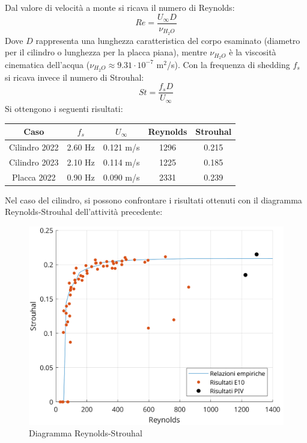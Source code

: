 \noindent Dal valore di velocità a monte si ricava il numero di Reynolds:
\begin{equation*}
    Re = \frac{U_\infty D}{\nu_{H_2O} }
\end{equation*}
Dove $D$ rappresenta una lunghezza caratteristica del corpo esaminato (diametro per il cilindro o lunghezza per la placca piana), mentre $\nu_{H_2O}$ è la viscosità cinematica dell'acqua ($\nu_{H_2O}\approx 9.31\cdot10^{-7}$ m$^2$/s). Con la frequenza di shedding $f_s$ si ricava invece il numero di Strouhal:
\begin{equation*}
    St = \frac{f_s D}{U_\infty}
\end{equation*}
Si ottengono i seguenti risultati:
\begin{table}[H]
    \centering
    \begin{tabular}{|c|c|c|c|c|}
    \hline
    Caso          & $f_s$   & $U_\infty$ & Reynolds & Strouhal \\ \hline
    Cilindro 2022 & 2.60 Hz & 0.121 m/s  & 1296     & 0.215    \\ \hline
    Cilindro 2023 & 2.10 Hz & 0.114 m/s  & 1225     & 0.185    \\ \hline
    Placca 2022   & 0.90 Hz & 0.090 m/s  & 2331     & 0.239    \\ \hline
    \end{tabular}
\end{table}

\noindent Nel caso del cilindro, si possono confrontare i risultati ottenuti con il diagramma Reynolds-Strouhal dell'attività precedente:
\begin{figure}[H]
    \centering
    \includegraphics[width=.75\textwidth]{images/11/Re-St.png}
    \caption{Diagramma Reynolds-Strouhal}
\end{figure}

